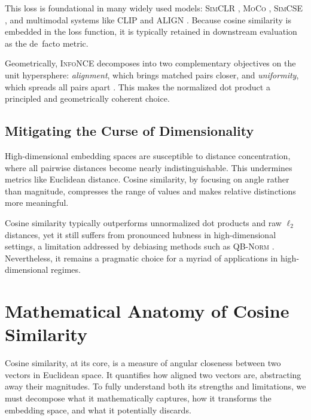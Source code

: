 \documentclass[11pt]{article}
\begin{document}
This loss is foundational in many widely used models: \textsc{SimCLR} \citep{chen_2020_SimpleFrameworkContrastive}, \textsc{MoCo} \citep{he_2020_MomentumContrastUnsupervised}, \textsc{SimCSE} \citep{gao_2021_SimCSESimpleContrastive}, and multimodal systems like \textsc{CLIP} and \textsc{ALIGN} \citep{jia_2021_ScalingVisualVisionlanguage}. Because cosine similarity is embedded in the loss function, it is typically retained in downstream evaluation as the de facto metric. 

Geometrically, \textsc{InfoNCE} decomposes into two complementary objectives on the unit hypersphere: \emph{alignment}, which brings matched pairs closer, and \emph{uniformity}, which spreads all pairs apart \citep{wang_2020_UnderstandingContrastiveRepresentation}. This makes the normalized dot product a principled and geometrically coherent choice.


\subsection{Mitigating the Curse of Dimensionality}

High-dimensional embedding spaces are susceptible to distance concentration, where all pairwise distances become nearly indistinguishable. This undermines metrics like Euclidean distance. Cosine similarity, by focusing on angle rather than magnitude, compresses the range of values and makes relative distinctions more meaningful.

Cosine similarity typically outperforms unnormalized dot products and raw $\ell_2$ distances, yet it still suffers from pronounced hubness in high-dimensional settings, a limitation addressed by debiasing methods such as \textsc{QB-Norm} \citep{bogolin_2022_CrossModalRetrieval}. Nevertheless, it remains a pragmatic choice for a myriad of  applications in high-dimensional regimes.



\section{Mathematical Anatomy of Cosine Similarity}\label{sec:math}

Cosine similarity, at its core, is a measure of angular closeness between two vectors in Euclidean space. It quantifies how aligned two vectors are, abstracting away their magnitudes. To fully understand both its strengths and limitations, we must decompose what it mathematically captures, how it transforms the embedding space, and what it potentially discards.
\end{document}
